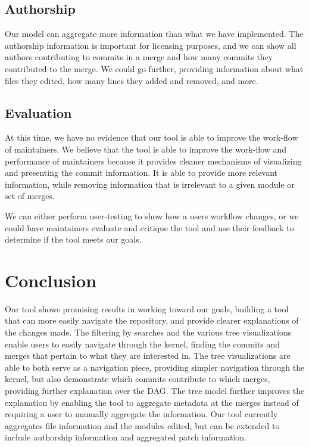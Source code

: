 \documentclass[conference, draftclsnofoot, draft]{IEEEtran}
\begin{document}
\subsection{Authorship}

Our model can aggregate more information than what we have implemented. The
authorship information is important for licensing purposes, and we can show all
authors contributing to commits in a  merge and how many commits they contributed to
the merge. We could go further, providing information about what files they edited,
how many lines they added and removed, and more.

\subsection{Evaluation}

At this time, we have no evidence that our tool is able to improve the work-flow of
maintainers. We believe that the tool is able to improve the work-flow and
performance of maintainers because it provides cleaner mechanisms of visualizing and
presenting the commit information. It is able to provide more relevant information,
while removing information that is irrelevant to a given module or set of merges.

We can either perform user-testing to show how a users workflow changes, or we could
have maintainers evaluate and critique the tool and use their feedback to determine
if the tool meets our goals.

\section{Conclusion}

Our tool shows promising results in working toward our goals, building a tool that
can more easily navigate the repository, and provide clearer explanations of the
changes made. The filtering by searches and the various tree visualizations enable
users to easily navigate through the kernel, finding the commits and merges that
pertain to what they are interested in. The tree visualizations are able to both
serve as a navigation piece, providing simpler navigation through the kernel, but
also demonstrate which commits contribute to which merges, providing further
explanation over the DAG. The tree model further improves the explanation by enabling
the tool to aggregate metadata at the merges instead of requiring a user to manually
aggregate the information. Our tool currently aggregates file information and the
modules edited, but can be extended to include authorship information and aggregated
patch information.
\end{document}
